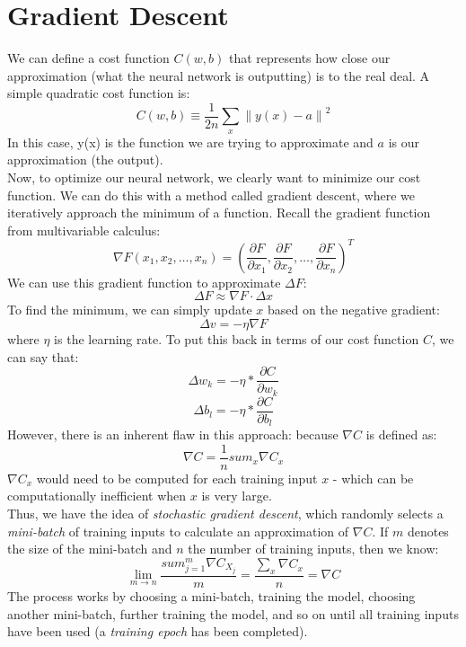 \documentclass{article}
\newcommand{\norm}[1]{\left\lVert#1\right\rVert}
\begin{document}
\section{Gradient Descent}
We can define a cost function $C(w, b)$ that represents how close our approximation (what the neural network is outputting) is to the real deal. A simple quadratic cost function is: 
\begin{equation}
C(w, b) \equiv \frac{1}{2n} \sum_{x} \norm{y(x) - a}^2
\end{equation}
In this case, y(x) is the function we are trying to approximate and $a$ is our approximation (the output). \\
Now, to optimize our neural network, we clearly want to minimize our cost function. We can do this with a method called gradient descent, where we iteratively approach the minimum of a function. Recall the gradient function from multivariable calculus:
\begin{equation}
\nabla F(x_1, x_2, \dots, x_n) = (\frac{\partial F}{\partial x_1}, \frac{\partial F}{\partial x_2}, \dots, \frac{\partial F}{\partial x_n})^{T}
\end{equation}
We can use this gradient function to approximate $\Delta F$:
\begin{equation}
\Delta F \approx \nabla F \cdot \Delta x
\end{equation}
To find the minimum, we can simply update $x$ based on the negative gradient:
\begin{equation}
\Delta v = -\eta \nabla F
\end{equation}
where $\eta$ is the learning rate. To put this back in terms of our cost function $C$, we can say that: \\
\begin{equation}
\Delta w_k = -\eta * \frac{\partial C}{\partial w_k}
\end{equation}
\begin{equation}
\Delta b_l = -\eta * \frac{\partial C}{\partial b_l}
\end{equation}
However, there is an inherent flaw in this approach: because $\nabla C$ is defined as:
\begin{equation*}
\nabla C = \frac{1}{n} sum_{x} \nabla C_x
\end{equation*}
$\nabla C_x$ would need to be computed for each training input $x$ - which can be computationally inefficient when $x$ is very large. \\
Thus, we have the idea of \textit{stochastic gradient descent}, which randomly selects a \textit{mini-batch} of training inputs to calculate an approximation of $\nabla C$. If $m$ denotes the size of the mini-batch and $n$ the number of training inputs, then we know:
\begin{equation}
\lim_{m \to n} \frac{sum_{j=1}^{m} \nabla C_{X_j}}{m} = \frac{\sum_x \nabla C_x}{n} = \nabla C
\end{equation}
The process works by choosing a mini-batch, training the model, choosing another mini-batch, further training the model, and so on until all training inputs have been used (a \textit{training epoch} has been completed). 
\end{document}
